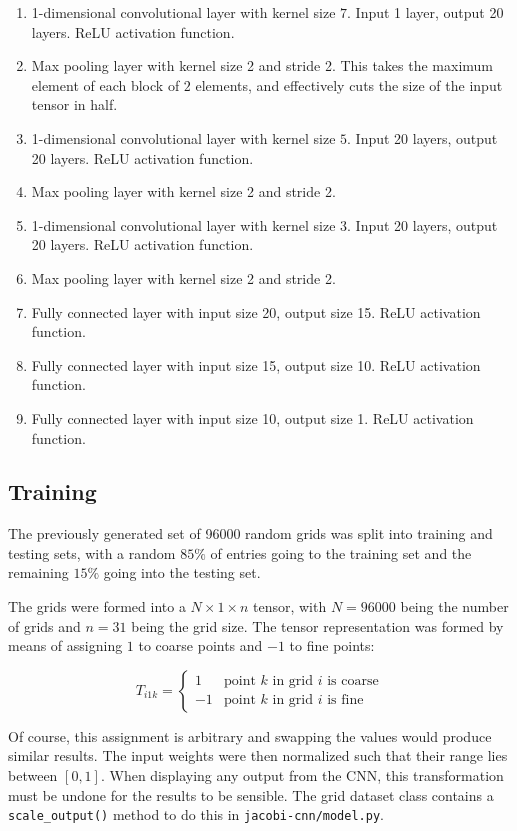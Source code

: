 \begin{enumerate}
\item 1-dimensional convolutional layer with kernel size $7$.  Input 1 layer, output 20 layers.  ReLU activation function.
\item Max pooling layer with kernel size 2 and stride 2.  This takes the maximum element of each block of $2$ elements, and effectively cuts the size of the input tensor in half.
\item 1-dimensional convolutional layer with kernel size $5$.  Input 20 layers, output 20 layers.  ReLU activation function.
\item Max pooling layer with kernel size 2 and stride 2.
\item 1-dimensional convolutional layer with kernel size $3$.  Input 20 layers, output 20 layers.  ReLU activation function.
\item Max pooling layer with kernel size 2 and stride 2.
\item Fully connected layer with input size 20, output size 15.  ReLU activation function.
\item Fully connected layer with input size 15, output size 10.  ReLU activation function.
\item Fully connected layer with input size 10, output size 1.  ReLU activation function.
\end{enumerate}

\subsection{Training}

The previously generated set of 96000 random grids was split into training and testing sets, with a random $85\%$ of entries going to the training set and the remaining $15\%$ going into the testing set.

The grids were formed into a $N\times 1 \times n$ tensor, with $N=96000$ being the number of grids and $n=31$ being the grid size.  The tensor representation was formed by means of assigning $1$ to coarse points and $-1$ to fine points:

$$
T_{i1k} = \begin{cases}
1 & \text{point $k$ in grid $i$ is coarse}\\
-1 & \text{point $k$ in grid $i$ is fine}
\end{cases}
$$

Of course, this assignment is arbitrary and swapping the values would produce similar results.  The input weights were then normalized such that their range lies between $\left[0, 1\right]$.  When displaying any output from the CNN, this transformation must be undone for the results to be sensible.  The grid dataset class contains a \texttt{scale\_output()} method to do this in \texttt{jacobi-cnn/model.py}.

